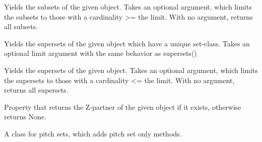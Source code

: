 \documentclass[letterpaper,10pt,english]{sphinxmanual}
\begin{document}
\begin{fulllineitems}
\begin{fulllineitems}
\end{fulllineitems}


\begin{fulllineitems}
\label{_templates/core:core.PPCSetBase.subsets}
Yields the subsets of the given object. Takes an optional argument,
which limits the subsets to those with a cardinality \textgreater{}= the limit.
With no argument, returns all subsets.

\end{fulllineitems}


\begin{fulllineitems}
\label{_templates/core:core.PPCSetBase.superprimes}
Yields the supersets of the given object which have a unique set-class.
Takes an optional limit argument with the same behavior as supersets()

\end{fulllineitems}


\begin{fulllineitems}
\label{_templates/core:core.PPCSetBase.supersets}
Yields the supersets of the given object. Takes an optional argument,
which limits the supersets to those with a cardinality \textless{}= the limit.
With no argument, returns all supersets.

\end{fulllineitems}


\begin{fulllineitems}
\label{_templates/core:core.PPCSetBase.zpartner}
Property that returns the Z-partner of the given object if it exists,
otherwise returns None.

\end{fulllineitems}


\end{fulllineitems}


\begin{fulllineitems}
\label{_templates/core:core.PSet}
A class for pitch sets, which adds pitch set only methods.

\end{fulllineitems}
\end{document}
